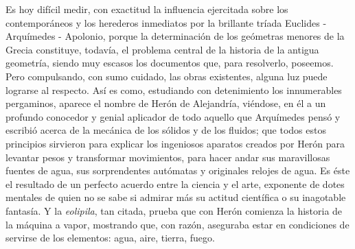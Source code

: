 \documentclass[a4paper, 12pt, draft]{article}
\begin{document}
{Es hoy difícil medir, con exactitud la influencia ejercitada sobre los contemporáneos y los herederos inmediatos por la brillante tríada Euclides - Arquímedes - Apolonio, porque la determinación de los geómetras menores de la Grecia constituye, todavía, el problema central de la historia de la antigua geometría, siendo muy escasos los documentos que, para resolverlo, poseemos. Pero compulsando, con sumo cuidado, las obras existentes, alguna luz puede lograrse al respecto. Así es como, estudiando con detenimiento los innumerables pergaminos, aparece el nombre de Herón de Alejandría, viéndose, en él a un profundo conocedor y genial aplicador de todo aquello que Arquímedes pensó y escribió acerca de la mecánica de los sólidos y de los fluidos; que todos estos principios sirvieron para explicar los ingeniosos aparatos creados por Herón para levantar pesos y transformar movimientos, para hacer andar sus maravillosas fuentes de agua, sus sorprendentes autómatas y originales relojes de agua. Es éste el resultado de un perfecto acuerdo entre la ciencia y el arte, exponente de dotes mentales de quien no se sabe  si admirar más su actitud científica o su inagotable fantasía. Y la \textit{ eolipila}, tan citada, prueba que con Herón comienza la historia de la máquina a vapor, mostrando que, con razón, aseguraba estar en condiciones de servirse de los elementos: agua, aire, tierra, fuego.
 
}
\end{document}
